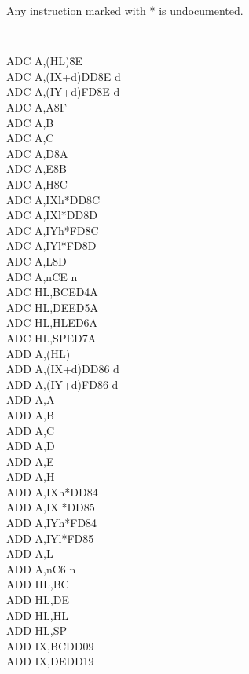 \documentclass[oneside,a4paper]{book}
\begin{document}
Any instruction marked with * is undocumented.
\begin{multicols}{3}

\scriptsize
{\tt
\begin{tabbing}
ADC A,(HL){\qquad}{\qquad}{\quad}\=8E\\
ADC A,(IX+d)\>DD8E d\\
ADC A,(IY+d)\>FD8E d\\
ADC A,A\>8F\\
ADC A,B\\
ADC A,C\\
ADC A,D\>8A\\
ADC A,E\>8B\\
ADC A,H\>8C\\
ADC A,IXh*\>DD8C\\
ADC A,IXl*\>DD8D\\
ADC A,IYh*\>FD8C\\
ADC A,IYl*\>FD8D\\
ADC A,L\>8D\\
ADC A,n\>CE n\\
ADC HL,BC\>ED4A\\
ADC HL,DE\>ED5A\\
ADC HL,HL\>ED6A\\
ADC HL,SP\>ED7A\\
ADD A,(HL)\\
ADD A,(IX+d)\>DD86 d\\
ADD A,(IY+d)\>FD86 d\\
ADD A,A\\
ADD A,B\\
ADD A,C\\
ADD A,D\\
ADD A,E\\
ADD A,H\\
ADD A,IXh*\>DD84\\
ADD A,IXl*\>DD85\\
ADD A,IYh*\>FD84\\
ADD A,IYl*\>FD85\\
ADD A,L\\
ADD A,n\>C6 n\\
ADD HL,BC\\
ADD HL,DE\\
ADD HL,HL\\
ADD HL,SP\\
ADD IX,BC\>DD09\\
ADD IX,DE\>DD19\\

\end{tabbing}}
\end{multicols}
\end{document}
